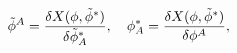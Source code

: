 \begin{equation*}
\tilde{\phi}^{A}=\frac{\delta X(\phi ,\tilde{\phi}^{\ast })}{\delta \tilde{%
\phi}_{A}^{\ast }},\quad \phi _{A}^{\ast }=\frac{\delta X(\phi ,\tilde{\phi}%
^{\ast })}{\delta \phi ^{A}},
\end{equation*}

